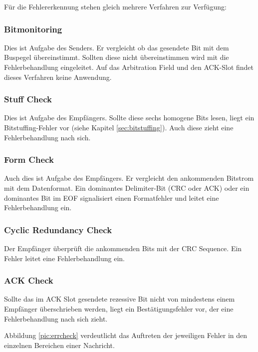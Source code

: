 Für die Fehlererkennung stehen gleich mehrere Verfahren zur Verfügung:

\subsubsection{Bitmonitoring}

Dies ist Aufgabe des Senders. Er vergleicht ob das gesendete Bit mit dem Buspegel übereinstimmt. 
Sollten diese nicht übereinstimmen wird mit die Fehlerbehandlung eingeleitet. Auf das Arbitration Field 
und den ACK-Slot findet dieses Verfahren keine Anwendung.

\subsubsection{Stuff Check}

Dies ist Aufgabe des Empfängers. Sollte diese sechs homogene Bits lesen, liegt ein Bitstuffing-Fehler 
vor (siehe Kapitel \ref{sec:bitstuffing}). Auch diese zieht eine Fehlerbehandlung nach sich.

\subsubsection{Form Check}

Auch dies ist Aufgabe des Empfängers. Er vergleicht den ankommenden Bitstrom mit dem Datenformat.
Ein dominantes Delimiter-Bit (CRC oder ACK) oder ein dominantes Bit im EOF signalisiert einen 
Formatfehler und leitet eine Fehlerbehandlung ein.

\subsubsection{Cyclic Redundancy Check}

Der Empfänger überprüft die ankommenden Bits mit der CRC Sequence. Ein Fehler leitet eine 
Fehlerbehandlung ein.

\subsubsection{ACK Check}
	
Sollte das im ACK Slot gesendete rezessive Bit nicht von mindestens einem Empfänger überschrieben 
werden, liegt ein Bestätigungsfehler vor, der eine Fehlerbehandlung nach sich zieht.

Abbildung \ref{pic:errcheck} verdeutlicht das Auftreten der jeweiligen Fehler in den einzelnen Bereichen
einer Nachricht.

